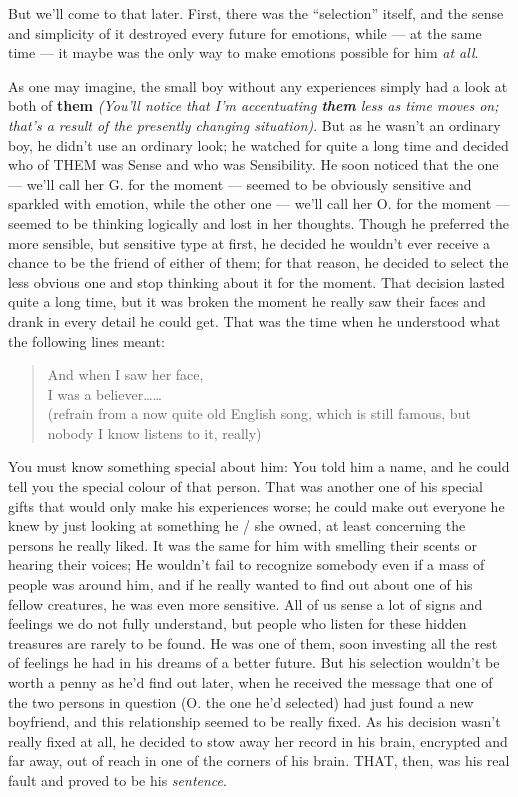 But we'll come to that later. First, there was the \enquote{selection} itself, and the sense and simplicity of it destroyed every future for emotions, while --- at the same time --- it maybe was the only way to make emotions possible for him \emph{at all}.

As one may imagine, the small boy without any experiences simply had a look at both of \textbf{them} \emph{(You'll notice that I'm accentuating \textbf{them} less as time moves on; that's a result of the presently changing situation)}. But as he wasn't an ordinary boy, he didn't use an ordinary look; he watched for quite a long time and decided who of THEM was Sense and who was Sensibility. He soon noticed that the one --- we'll call her G. for the moment --- seemed to be obviously sensitive and sparkled with emotion, while the other one --- we'll call her O. for the moment --- seemed to be thinking logically and lost in her thoughts. Though he preferred the more sensible, but sensitive type at first, he decided he wouldn't ever receive a chance to be the friend of either of them; for that reason, he decided to select the less obvious one and stop thinking about it for the moment. That decision lasted quite a long time, but it was broken the moment he really saw their faces and drank in every detail he could get.
That was the time when he understood what the following lines meant:
\begin{quote}
  And when I saw her face,\\
  I was a believer\ldots\ldots\\
  (refrain from a now quite old English song, which is still famous, but nobody I know listens to it, really)
\end{quote}
You must know something special about him: You told him a name, and he could tell you the special colour of that person. That was another one of his special gifts that would only make his experiences worse; he could make out everyone he knew by just looking at something he / she owned, at least concerning the persons he really liked. It was the same for him with smelling their scents or hearing their voices; He wouldn't fail to recognize somebody even if a mass of people was around him, and if he really wanted to find out about one of his fellow creatures, he was even more sensitive. All of us sense a lot of signs and feelings we do not fully understand, but people who listen for these hidden treasures are rarely to be found. 
He was one of them, soon investing all the rest of feelings he had in his dreams of a better future. But his selection wouldn't be worth a penny as he'd find out later, when he received the message that one of the two persons in question (O. the one he'd selected) had just found a new boyfriend, and this relationship seemed to be really fixed. As his decision wasn't really fixed at all, he decided to stow away her record in his brain, encrypted and far away, out of reach in one of the corners of his brain. THAT, then, was his real fault and proved to be his \emph{sentence}.

